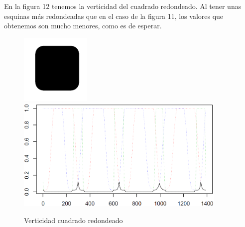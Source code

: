 En la figura 12 tenemos la verticidad del cuadrado redondeado. Al tener unas esquinas más redondeadas que en el caso de la figura 11, los valores que obtenemos son mucho menores, como es de esperar.\\

\begin{figure}[H]
\begin{center}

\includegraphics[width=0.3\textwidth]{img/device3-1.png}
\newline
\includegraphics[width=0.9\textwidth]{img/vert-dev3-1-limpio.png}
\end{center}

\caption{Verticidad cuadrado redondeado}
\end{figure}
